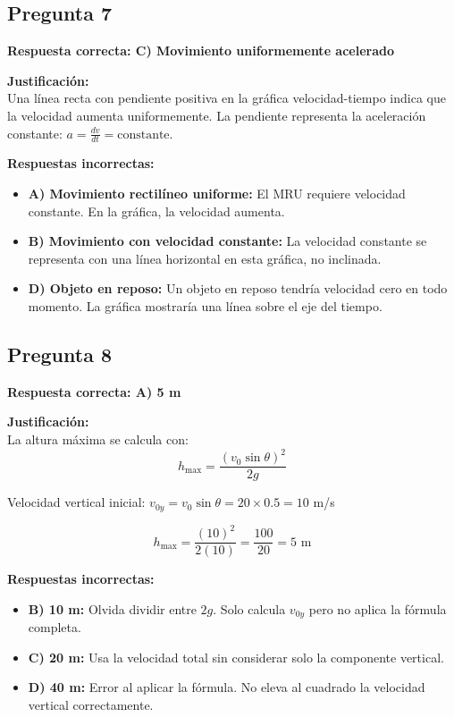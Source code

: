 \newpage

\begin{respuestabox}
\subsection{Pregunta 7}
\textcolor{verdecorrecto}{\textbf{Respuesta correcta: C) Movimiento uniformemente acelerado}}

\textbf{Justificación:}\\
Una línea recta con pendiente positiva en la gráfica velocidad-tiempo indica que la velocidad aumenta uniformemente. La pendiente representa la aceleración constante: $a = \frac{dv}{dt} = \text{constante}$.

\textbf{Respuestas incorrectas:}
\begin{itemize}
    \item \textbf{A) Movimiento rectilíneo uniforme:} El MRU requiere velocidad constante. En la gráfica, la velocidad aumenta.
    \item \textbf{B) Movimiento con velocidad constante:} La velocidad constante se representa con una línea horizontal en esta gráfica, no inclinada.
    \item \textbf{D) Objeto en reposo:} Un objeto en reposo tendría velocidad cero en todo momento. La gráfica mostraría una línea sobre el eje del tiempo.
\end{itemize}
\end{respuestabox}

\begin{respuestabox}
\subsection{Pregunta 8}
\textcolor{verdecorrecto}{\textbf{Respuesta correcta: A) 5 m}}

\textbf{Justificación:}\\
La altura máxima se calcula con:
$$h_{\text{max}} = \frac{(v_0 \sin \theta)^2}{2g}$$

Velocidad vertical inicial: $v_{0y} = v_0 \sin \theta = 20 \times 0.5 = 10$ m/s

$$h_{\text{max}} = \frac{(10)^2}{2(10)} = \frac{100}{20} = 5 \text{ m}$$

\textbf{Respuestas incorrectas:}
\begin{itemize}
    \item \textbf{B) 10 m:} Olvida dividir entre $2g$. Solo calcula $v_{0y}$ pero no aplica la fórmula completa.
    \item \textbf{C) 20 m:} Usa la velocidad total sin considerar solo la componente vertical.
    \item \textbf{D) 40 m:} Error al aplicar la fórmula. No eleva al cuadrado la velocidad vertical correctamente.
\end{itemize}
\end{respuestabox}


